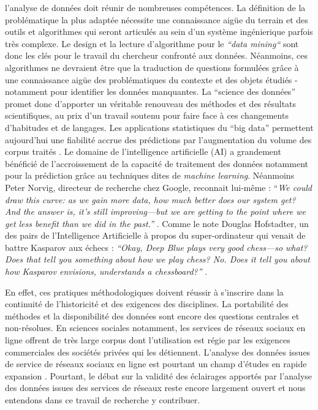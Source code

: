 l{\textquoteright}analyse de donn\'ees doit r\'eunir de nombreuses
comp\'etences. La d\'efinition de la probl\'ematique la plus adapt\'ee
n\'ecessite une connaissance aig\"ue du terrain et des outils et
algorithmes qui seront articul\'es au sein d{\textquoteright}un
syst\`eme ing\'enierique parfois tr\`es complexe. Le design et la
lecture d{\textquoteright}algorithme pour le
\textit{{\textquotedblleft}data mining{\textquotedblleft}} sont donc
les cl\'es pour le travail du chercheur confront\'e aux donn\'ees.
N\'eanmoins, ces algorithmes ne devraient \^etre que la traduction de
questions formul\'ees gr\^ace \`a une connaissance aig\"ue des
probl\'ematiques du contexte et des objets \'etudi\'es - notamment pour
identifier les donn\'ees manquantes. La {\textquotedblleft}science des
donn\'ees{\textquotedblright} promet donc d{\textquoteright}apporter un
v\'eritable renouveau des m\'ethodes et des r\'esultats scientifiques,
au prix d{\textquoteright}un travail soutenu pour faire face \`a ces
changements d{\textquoteright}habitudes et de langages. Les
applications statistiques du {\textquotedblleft}big
data{\textquotedblright} permettent aujourd{\textquoteright}hui une
fiabilit\'e accrue des pr\'edictions par l{\textquoteright}augmentation
du volume des corpus trait\'es \citep{Breiman2001}. Le domaine de
l{\textquoteright}intelligence artificielle (AI) a grandement
b\'en\'efici\'e de l{\textquoteright}accroissement de la capacit\'e de
traitement des donn\'ees notamment pour la pr\'ediction gr\^ace au
techniques dites de \textit{machine learning}. N\'eanmoins Peter
Norvig, directeur de recherche chez Google, reconnait lui-m\^eme :
{\textquotedblleft}\textit{We could draw this curve: as we gain more
data, how much better does our system get? And the answer is,
it{\textquoteright}s still improving---but we are getting to the point
where we get less benefit than we did in the past.{\textquotedblright}
}\citep{Somers2013}. Comme le note Douglas Hofstadter, un des pairs de
l{\textquoteright}Intelligence Artificielle \`a propos du
super-ordinateur qui venait de battre Kasparov aux \'echecs :
\textit{{\textquotedblleft}Okay, Deep Blue plays very good chess---so
what? Does that tell you something about how we play chess? No. Does it
tell you about how Kasparov envisions, understands a
chessboard?{\textquotedblright} }\citep{Somers2013}. 

En effet, ces pratiques m\'ethodologiques doivent r\'eussir \`a
s{\textquoteright}inscrire dans la continuit\'e de
l{\textquoteright}historicit\'e et des exigences des disciplines. La
portabilit\'e des m\'ethodes et la disponibilit\'e des donn\'ees sont
encore des questions centrales et non-r\'esolues. En sciences sociales
notamment, les services de r\'eseaux sociaux en ligne offrent de tr\`es
large corpus dont l{\textquoteright}utilisation est r\'egie par les
exigences commerciales des soci\'et\'es priv\'ees qui les d\'etiennent.
L{\textquoteright}analyse des donn\'ees issues de service de r\'eseaux
sociaux en ligne est pourtant un champ d{\textquoteright}\'etudes en
rapide expansion \citep{Nettleton2013}. Pourtant, le d\'ebat sur la
validit\'e des \'eclairages apport\'es par l{\textquoteright}analyse
des donn\'ees issues des services de r\'eseaux reste encore largement
ouvert et nous entendons dans ce travail de recherche y contribuer. 

